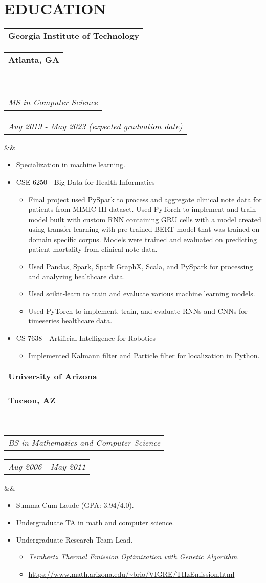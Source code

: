 \documentclass[11pt,a4paper,roman]{moderncv}
\makeatletter
\newcommand*{\customcventry}[7][.25em]{
  \begin{tabular}{@{}l} 
    {\bfseries #4}
  \end{tabular}
  \hfill %
  \begin{tabular}{l@{}}
     {\bfseries #5}
  \end{tabular} \\
  \begin{tabular}{@{}l} 
    {\itshape #3}
  \end{tabular}
  \hfill %
  \begin{tabular}{l@{}}
     {\itshape #2}
  \end{tabular}
  \ifx&#7&%
  \else{\\%
    \begin{minipage}{\maincolumnwidth}%
      \small#7%
    \end{minipage}}\fi%
  \par\addvspace{#1}}
\makeatother
\begin{document}
{{\section{EDUCATION}
{\customcventry{Aug 2019 - May 2023 (expected graduation date)}{MS in Computer Science}{Georgia Institute of Technology}{Atlanta, GA}
{}{}
{
\begin{itemize}
  \item Specialization in machine learning.
  \item CSE 6250 - Big Data for Health Informatics
  \begin{itemize}
  	\item Final project used PySpark to process and aggregate clinical note data for patients from MIMIC III dataset. Used PyTorch to implement and train model built with custom RNN containing GRU cells with a model created using transfer learning with pre-trained BERT model that was trained on domain specific corpus. Models were trained and evaluated on predicting patient mortality from clinical note data.
  	\item Used Pandas, Spark, Spark GraphX, Scala, and PySpark for processing and analyzing healthcare data.
  	\item Used scikit-learn to train and evaluate various machine learning models.
  	\item Used PyTorch to implement, train, and evaluate RNNs and CNNs for timeseries healthcare data.
  \end{itemize}
  \item CS 7638 - Artificial Intelligence for Robotics
  \begin{itemize}
  	\item Implemented Kalmann filter and Particle filter for localization in Python.
  \end{itemize}
 \end{itemize}
}

\vspace{12pt}

{\customcventry{Aug 2006 - May 2011}{BS in Mathematics and Computer Science}{University of Arizona}{Tucson, AZ}{}{}
{\begin{itemize}
  \item Summa Cum Laude (GPA: 3.94/4.0).
  \item Undergraduate TA in math and computer science.
  \item Undergraduate Research Team Lead.
  \begin{itemize}
    \item \textit{Terahertz Thermal Emission Optimization with Genetic Algorithm}.
    \item \url{https://www.math.arizona.edu/~brio/VIGRE/THzEmission.html}
  \end{itemize}
\end{itemize}
}

}}}}
\end{document}
